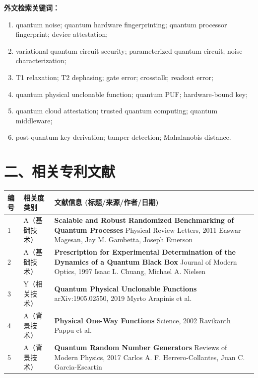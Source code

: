 \documentclass[12pt,a4paper]{article}
\begin{document}
\textbf{外文检索关键词：}
\begin{enumerate}[leftmargin=2em]
    \item quantum noise; quantum hardware fingerprinting; quantum processor fingerprint; device attestation;
    \item variational quantum circuit security; parameterized quantum circuit; noise characterization;
    \item T1 relaxation; T2 dephasing; gate error; crosstalk; readout error;
    \item quantum physical unclonable function; quantum PUF; hardware-bound key;
    \item quantum cloud attestation; trusted quantum computing; quantum middleware;
    \item post-quantum key derivation; tamper detection; Mahalanobis distance.
\end{enumerate}

\section*{二、相关专利文献}

\renewcommand{\arraystretch}{1.5}
\begin{longtable}{|p{1.5cm}|p{6cm}|p{7.5cm}|}
\hline
\textbf{编号} & \textbf{相关度类别} & \textbf{文献信息 (标题/来源/作者/日期)} \\
\hline
1 & A（基础技术） & \textbf{Scalable and Robust Randomized Benchmarking of Quantum Processes} \newline Physical Review Letters, 2011 \newline Easwar Magesan, Jay M. Gambetta, Joseph Emerson \\
\hline
2 & A（基础技术） & \textbf{Prescription for Experimental Determination of the Dynamics of a Quantum Black Box} \newline Journal of Modern Optics, 1997 \newline Isaac L. Chuang, Michael A. Nielsen \\
\hline
3 & Y（相关技术） & \textbf{Quantum Physical Unclonable Functions} \newline arXiv:1905.02550, 2019 \newline Myrto Arapinis et al. \\
\hline
4 & A（背景技术） & \textbf{Physical One-Way Functions} \newline Science, 2002 \newline Ravikanth Pappu et al. \\
\hline
5 & A（背景技术） & \textbf{Quantum Random Number Generators} \newline Reviews of Modern Physics, 2017 \newline Carlos A. F. Herrero-Collantes, Juan C. Garcia-Escartin \\
\hline
\end{longtable}
\end{document}
